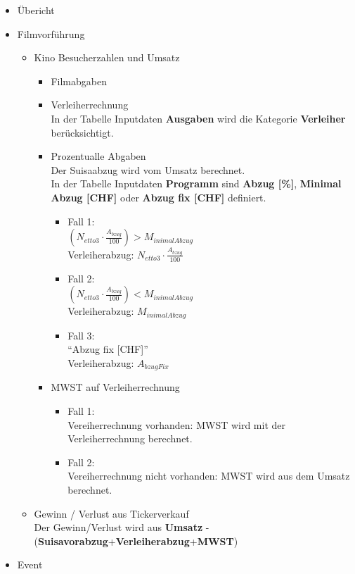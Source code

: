 \documentclass[
]{article}
\providecommand{\tightlist}{%
  \setlength{\itemsep}{0pt}\setlength{\parskip}{0pt}}
\begin{document}
\begin{itemize}
\tightlist
\item
  Übericht
\item
  Filmvorführung

  \begin{itemize}
  \tightlist
  \item
    Kino Besucherzahlen und Umsatz

    \begin{itemize}
    \item
      Filmabgaben
    \item
      Verleiherrechnung\\
      In der Tabelle Inputdaten \textbf{Ausgaben} wird die Kategorie
      \textbf{Verleiher} berücksichtigt.
    \item
      Prozentualle Abgaben\\
      Der Suisaabzug wird vom Umsatz berechnet.\\
      In der Tabelle Inputdaten \textbf{Programm} sind \textbf{Abzug
      {[}\%{]}}, \textbf{Minimal Abzug {[}CHF{]}} oder \textbf{Abzug fix
      {[}CHF{]}} definiert.\\

      \begin{itemize}
      \tightlist
      \item
        Fall 1:\\
        \((N_{etto3} \cdot \frac {A_{bzug}}{100}) > M_{inimalAbzug}\)\\
        Verleiherabzug: \(N_{etto3}\cdot \frac{A_{bzug}}{100}\)
      \item
        Fall 2:\\
        \((N_{etto3} \cdot \frac {A_{bzug}}{100}) < M_{inimalAbzug}\)\\
        Verleiherabzug: \(M_{inimalAbzug}\)
      \item
        Fall 3:\\
        ``Abzug fix {[}CHF{]}''\\
        Verleiherabzug: \(A_{bzugFix}\)
      \end{itemize}
    \item
      MWST auf Verleiherrechnung\\

      \begin{itemize}
      \tightlist
      \item
        Fall 1:\\
        Vereiherrechnung vorhanden: MWST wird mit der Verleiherrechnung
        berechnet.
      \item
        Fall 2:\\
        Vereiherrechnung nicht vorhanden: MWST wird aus dem Umsatz
        berechnet.
      \end{itemize}
    \end{itemize}
  \item
    Gewinn / Verlust aus Tickerverkauf\\
    Der Gewinn/Verlust wird aus \textbf{Umsatz} -
    (\textbf{Suisavorabzug}+\textbf{Verleiherabzug}+\textbf{MWST})
  \end{itemize}
\item
  Event


\end{itemize}
\end{document}
